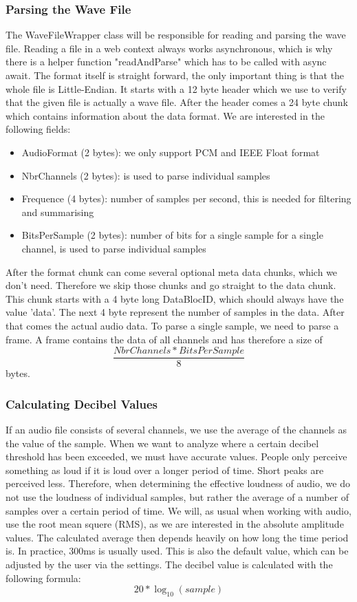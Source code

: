 \subsubsection{Parsing the Wave File}
The WaveFileWrapper class will be responsible for reading and parsing the wave file. Reading a file in a web context always works asynchronous, which is why there is a helper function "readAndParse" which has to be called with async await.
The format itself is straight forward\cite{wav_file_format_wikipedia}, the only important thing is that the whole file is Little-Endian.
It starts with a 12 byte header which we use to verify that the given file is actually a wave file.
After the header comes a 24 byte chunk which contains information about the data format.
We are interested in the following fields:
\begin{itemize}
    \item AudioFormat (2 bytes): we only support PCM and IEEE Float format
    \item NbrChannels (2 bytes): is used to parse individual samples
    \item Frequence (4 bytes): number of samples per second, this is needed for filtering and summarising
    \item BitsPerSample (2 bytes): number of bits for a single sample for a single channel, is used to parse individual samples
\end{itemize}
After the format chunk can come several optional meta data chunks, which we don't need. Therefore we skip those chunks and go straight to the data chunk.
This chunk starts with a 4 byte long DataBlocID, which should always have the value 'data'.
The next 4 byte represent the number of samples in the data.
After that comes the actual audio data.
To parse a single sample, we need to parse a frame.
A frame contains the data of all channels and has therefore a size of \[\frac{NbrChannels * BitsPerSample}{8}\] bytes.

\subsubsection{Calculating Decibel Values}
If an audio file consists of several channels, we use the average of the channels as the value of the sample.
When we want to analyze where a certain decibel threshold has been exceeded, we must have accurate values.
People only perceive something as loud if it is loud over a longer period of time.
Short peaks are perceived less.
Therefore, when determining the effective loudness of audio, we do not use the loudness of individual samples, but rather the average of a number of samples over a certain period of time. We will, as usual when working with audio, use the root mean squere (RMS), as we are interested in the absolute amplitude values.
The calculated average then depends heavily on how long the time period is.
In practice, 300ms is usually used\cite{timespan_for_audio_rms_calculate}.
This is also the default value, which can be adjusted by the user via the settings.
The decibel value is calculated with the following formula\cite{decibel_wikipedia}:
\[20 * \log_{10} (sample)\]

